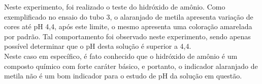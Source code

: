 \begin{figure}[h]
            \label{fig:experimento13}
        \end{figure}
    	
    	\indent Neste experimento, foi realizado o teste do hidróxido de amônio. Como exemplificado no ensaio do tubo 3, o alaranjado de metila apresenta variação de cores até pH 4,4, após este limite, o mesmo apresenta uma coloração amarelada por padrão. Tal comportamento foi observado neste experimento, sendo apenas possível determinar que o pH desta solução é superior a 4,4. \\
    	
    	\indent Neste caso em específico, é fato conhecido que o hidróxido de amônio é um composto químico com forte caráter básico, e portanto, o indicador alaranjado de metila não é um bom indicador para o estudo de pH da solução em questão.\\
    	
